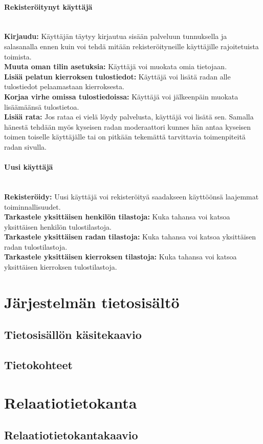\documentclass[10pt,a4paper]{article}
\begin{document}
\paragraph{Rekisteröitynyt käyttäjä} \hspace{0pt}
\\\textbf{Kirjaudu:} Käyttäjän täytyy kirjautua sisään palveluun tunnuksella ja salasanalla ennen kuin voi tehdä mitään rekisteröityneille käyttäjille rajoitetuista toimista.
\\\textbf{Muuta oman tilin asetuksia:} Käyttäjä voi muokata omia tietojaan.
\\\textbf{Lisää pelatun kierroksen tulostiedot:} Käyttäjä voi lisätä radan alle tulostiedot pelaamastaan kierroksesta.
\\\textbf{Korjaa virhe omissa tulostiedoissa:} Käyttäjä voi jälkeenpäin muokata lisäämäänsä tulostietoa.
\\\textbf{Lisää rata:} Jos rataa ei vielä löydy palvelusta, käyttäjä voi lisätä sen. Samalla hänestä tehdään myös kyseisen radan moderaattori kunnes hän antaa kyseisen toimen toiselle käyttäjälle tai on pitkään tekemättä tarvittavia toimenpiteitä radan sivulla.
\paragraph{Uusi käyttäjä} \hspace{0pt}
\\\textbf{Rekisteröidy:} Uusi käyttäjä voi rekisteröityä saadakseen käyttöönsä laajemmat toiminnallisuudet.
\\\textbf{Tarkastele yksittäisen henkilön tilastoja:} Kuka tahansa voi katsoa yksittäisen henkilön tulostilastoja.
\\\textbf{Tarkastele yksittäisen radan tilastoja:} Kuka tahansa voi katsoa yksittäisen radan tulostilastoja.
\\\textbf{Tarkastele yksittäisen kierroksen tilastoja:} Kuka tahansa voi katsoa yksittäisen kierroksen tulostilastoja.


\newpage
\section{Järjestelmän tietosisältö}
\subsection{Tietosisällön käsitekaavio}
\subsection{Tietokohteet}
\newpage
\section{Relaatiotietokanta}
\subsection{Relaatiotietokantakaavio}
\end{document}
